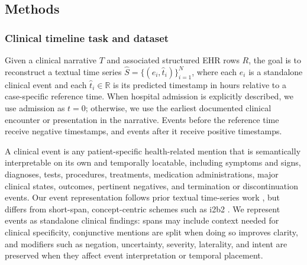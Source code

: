 \subsection{Methods}
\label{ch08:sec:methods}
\ChEightHeadingOnly


% 
\subsubsection{Clinical timeline task and dataset}
\label{ch08:sec:data}


Given a clinical narrative $T$ and associated structured EHR rows $R$, the goal is to reconstruct a textual time series $\hat{S}=\{(e_i,\hat{t}_i)\}_{i=1}^{N}$, where each $e_i$ is a standalone clinical event and each $\hat{t}_i \in \mathbb{R}$ is its predicted timestamp in hours relative to a case-specific reference time.
When hospital admission is explicitly described, we use admission as $t=0$; otherwise, we use the earliest documented clinical encounter or presentation in the narrative.
Events before the reference time receive negative timestamps, and events after it receive positive timestamps.

A clinical event is any patient-specific health-related mention that is semantically interpretable on its own and temporally locatable, including symptoms and signs, diagnoses, tests, procedures, treatments, medication administrations, major clinical states, outcomes, pertinent negatives, and termination or discontinuation events.
Our event representation follows prior textual time-series work \cite{ch08:wang2025large,noroozizadeh2026reconstructing,ch08:noroozizadeh2025pmoa,ch08:kumar2026temporally}, but differs from short-span, concept-centric schemes such as i2b2 \cite{ch08:uzuner20112010,sun2013evaluating}.
We represent events as standalone clinical findings: spans may include context needed for clinical specificity, conjunctive mentions are split when doing so improves clarity, and modifiers such as negation, uncertainty, severity, laterality, and intent are preserved when they affect event interpretation or temporal placement.

